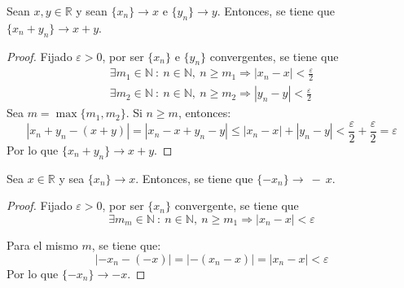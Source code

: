\begin{prop}\label{prop:5.3.1}
    Sean $x,y \in \mathbb{R}$ y sean $\{x_n\} \longrightarrow x$ e $\{y_n\} \longrightarrow y$. Entonces, se tiene que $\{x_n + y_n\} \longrightarrow x+y$.
\end{prop}
\begin{proof}
    Fijado $\varepsilon > 0$, por ser $\{x_n\}$ e $\{y_n\}$ convergentes, se tiene que
    \begin{gather*}
        \exists m_1 \in \mathbb{N} ~:~ n \in \mathbb{N},~ n \geq m_1 \Longrightarrow \left|x_n - x \right| < \frac{\varepsilon}{2} \\
        \exists m_2 \in \mathbb{N} ~:~ n \in \mathbb{N},~ n \geq m_2 \Longrightarrow \left|y_n - y \right| < \frac{\varepsilon}{2}
    \end{gather*}
    Sea $m = \max \{m_1,m_2\}$. Si $ n \geq m$, entonces:
    \begin{equation*}
        \left|x_n + y_n - (x+y) \right| = \left|x_n - x + y_n - y \right| \leq |x_n - x| + |y_n - y| < \frac{\varepsilon}{2} + \frac{\varepsilon}{2} = \varepsilon
    \end{equation*}
    Por lo que $\{x_n + y_n\} \longrightarrow x+y$.
\end{proof}

\begin{prop}
    Sea $x \in \mathbb{R}$ y sea $\{x_n\} \longrightarrow x$. Entonces, se tiene que $\{-x_n\} \longrightarrow~-~x$.
\end{prop}
\begin{proof}
    Fijado $\varepsilon > 0$, por ser $\{x_n\}$ convergente, se tiene que
    \begin{equation*}
        \exists m_m \in \mathbb{N} ~:~ n \in \mathbb{N},~ n \geq m_1 \Longrightarrow \left|x_n - x \right| < \varepsilon
    \end{equation*}
    
    Para el mismo $m$, se tiene que:
    \begin{equation*}
        |-x_n -(-x)| = |-(x_n - x)| = |x_n - x| < \varepsilon
    \end{equation*}
    Por lo que $\{-x_n\} \longrightarrow -x$.
\end{proof}


